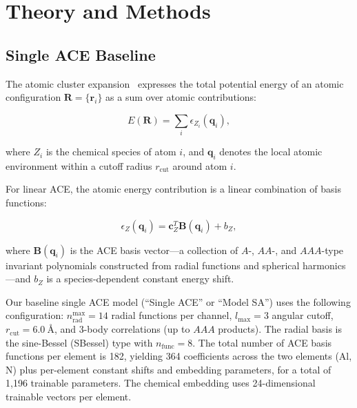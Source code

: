 \documentclass[twoside,prb,aps,floatfix,superscriptaddress,longbibliography]{revtex4-2}
\begin{document}
\section{Theory and Methods}
\label{sec:methods}

\subsection{Single ACE Baseline}
\label{sec:single_ace}

The atomic cluster expansion~\cite{Drautz2019ACE} expresses the total potential energy of an atomic configuration $\mathbf{R} = \{\mathbf{r}_i\}$ as a sum over atomic contributions:

\begin{equation}
E(\mathbf{R}) = \sum_{i} \epsilon_{Z_i}(\mathbf{q}_i),
\label{eq:ace_total}
\end{equation}

where $Z_i$ is the chemical species of atom $i$, and $\mathbf{q}_i$ denotes the local atomic environment within a cutoff radius $r_{\mathrm{cut}}$ around atom $i$.

For linear ACE, the atomic energy contribution is a linear combination of basis functions:

\begin{equation}
\epsilon_{Z}(\mathbf{q}_i) = \mathbf{c}_{Z}^T \mathbf{B}(\mathbf{q}_i) + b_{Z},
\label{eq:ace_linear}
\end{equation}

where $\mathbf{B}(\mathbf{q}_i)$ is the ACE basis vector---a collection of $A$-, $AA$-, and $AAA$-type invariant polynomials constructed from radial functions and spherical harmonics---and $b_Z$ is a species-dependent constant energy shift.

Our baseline single ACE model (``Single ACE'' or ``Model SA'') uses the following configuration: $n_{\mathrm{rad}}^{\mathrm{max}} = 14$ radial functions per channel, $l_{\mathrm{max}} = 3$ angular cutoff, $r_{\mathrm{cut}} = \SI{6.0}{\angstrom}$, and 3-body correlations (up to $AAA$ products). The radial basis is the sine-Bessel (SBessel) type with $n_{\mathrm{func}} = 8$. The total number of ACE basis functions per element is 182, yielding 364 coefficients across the two elements (Al, N) plus per-element constant shifts and embedding parameters, for a total of 1,196 trainable parameters. The chemical embedding uses 24-dimensional trainable vectors per element.
\end{document}

